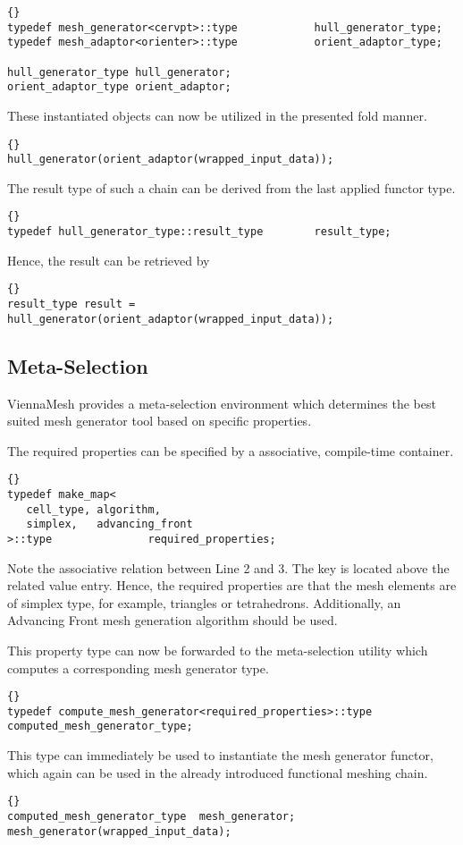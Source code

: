 \begin{lstlisting}{}
typedef mesh_generator<cervpt>::type            hull_generator_type;
typedef mesh_adaptor<orienter>::type            orient_adaptor_type;

hull_generator_type hull_generator;
orient_adaptor_type orient_adaptor;
\end{lstlisting}

These instantiated objects can now be utilized in the presented fold manner.
\begin{lstlisting}{}
hull_generator(orient_adaptor(wrapped_input_data));
\end{lstlisting}

The result type of such a chain can be derived from the last applied functor type.
\begin{lstlisting}{}
typedef hull_generator_type::result_type        result_type;
\end{lstlisting}

Hence, the result can be retrieved by
\begin{lstlisting}{}
result_type result = hull_generator(orient_adaptor(wrapped_input_data));
\end{lstlisting}

\subsection{Meta-Selection}

ViennaMesh provides a meta-selection environment which determines the 
best suited mesh generator tool based on specific properties. 

The required properties can be specified by a associative, compile-time container.
\begin{lstlisting}{}
typedef make_map<
   cell_type, algorithm,      
   simplex,   advancing_front
>::type               required_properties;
\end{lstlisting}
Note the associative relation between Line 2 and 3. The key is located 
above the related value entry. Hence, the required properties are that 
the mesh elements are of simplex type, for example, triangles or tetrahedrons.
Additionally, an Advancing Front mesh generation algorithm should be used.

This property type can now be forwarded to the meta-selection utility which 
computes a corresponding mesh generator type.
\begin{lstlisting}{}
typedef compute_mesh_generator<required_properties>::type   computed_mesh_generator_type;
\end{lstlisting}

This type can immediately be used to instantiate the mesh generator functor, 
which again can be used in the already introduced functional meshing chain.
\begin{lstlisting}{}
computed_mesh_generator_type  mesh_generator;
mesh_generator(wrapped_input_data);
\end{lstlisting}


